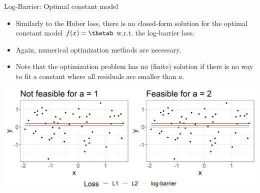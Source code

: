 \begin{vbframe}{Log-Barrier: Optimal constant model}

\begin{itemize}
 \item Similarly to the Huber loss, there is no closed-form solution for the optimal constant model $\fx = \thetab$ w.r.t. the log-barrier loss. 
 \item Again, numerical optimization methods are necessary.
 \item Note that the optimization problem has no (finite) solution if there is no way to fit a constant where all residuals are smaller than $a$.  
\end{itemize}

\vspace{0.2cm}

\begin{center}
\includegraphics[width = \textwidth]{figure/loss_logbarrier_2.png}
\end{center}


% 
% 
% 
% 
% 


\end{vbframe}


